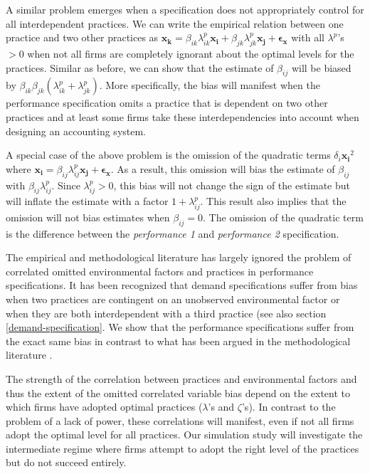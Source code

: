 \documentclass[12pt]{article}
\begin{document}
A similar problem emerges when a specification does not appropriately control for all interdependent practices. We can write the empirical relation between one practice and two other practices as $\mathbf{x_k} = \beta_{ik} \lambda^p_{ik} \mathbf{x_i} + \beta_{jk} \lambda^p_{jk} \mathbf{x_j} + \mathbf{\epsilon_x}$ with all $\lambda^p$'s $>0$ when not all firms are completely ignorant about the optimal levels for the practices. Similar as before, we can show that the estimate of $\beta_{ij}$ will be biased by $\beta_{ik} \beta_{jk} (\lambda^p_{ik} + \lambda^p_{jk})$. More specifically, the bias will manifest when the performance specification omits a practice that is dependent on two other practices and at least some firms take these interdependencies into account when designing an accounting system.

A special case of the above problem is the omission of the quadratic terms $\delta_i \mathbf{x_i}^2$ where $\mathbf{x_i} =  \beta_{ij} \lambda^p_{ij} \mathbf{x_j} + \mathbf{\epsilon_x}$. As a result, this omission will bias the estimate of $\beta_{ij}$ with $\beta_{ij} \lambda^p_{ij}$. Since $\lambda^p_{ij} > 0$, this bias will not change the sign of the estimate but will inflate the estimate with a factor $1 + \lambda^p_{ij}$.  This result also implies that the omission will not bias estimates when $\beta_{ij} = 0$. The omission of the quadratic term is the difference between the \emph{performance 1} and \emph{performance 2} specification.

The empirical and methodological literature has largely ignored the problem of correlated omitted environmental factors and practices in performance specifications. It has been recognized that demand specifications suffer from bias when two practices are contingent on an unobserved environmental factor or when they are both interdependent with a third practice (see also section \ref{demand-specification}. We show that the performance specifications suffer from the exact same bias in contrast to what has been argued in the methodological literature \citep{Carree2011}. 

The strength of the correlation between practices and environmental factors and thus the extent of the omitted correlated variable bias depend on the extent to which firms have adopted optimal practices ($\lambda$'s and $\zeta$'s). In contrast to the problem of a lack of power, these correlations will manifest, even if not all firms adopt the optimal level for all practices. Our simulation study will investigate the intermediate regime where firms attempt to adopt the right level of the practices but do not succeed entirely.
\end{document}
